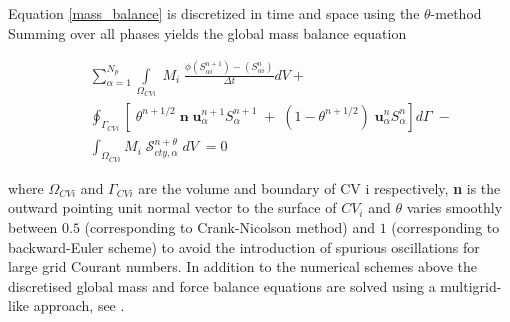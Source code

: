\documentclass[preprint,authoryear,12pt]{elsarticle}
\begin{document}
Equation \ref{mass_balance} is discretized in time and space using the $\theta$-method %
Summing over all phases yields the global mass balance equation %

\begin{eqnarray}
 && \sum_{\alpha=1}^{N_{p}} \int\limits_{\Omega_{CVi}} \; M_{i} \; \frac{\phi\left(S_{\alpha i}^{n+1}\right)-\left(S_{\alpha i}^{n}\right)}{\Delta t} dV  + \nonumber\\
 &&  \oint_{\Gamma_{CVi}} [\; \theta^{n+1/2}\; {\mathbf n}\dot \; {\mathbf u}_{\alpha}^{n+1}S_{\alpha}^{n+1} \; + \; (1-\theta^{n+1/2}) \; {\mathbf u}_{\alpha}^{n}S_{\alpha}^{n}] d\Gamma \;- \nonumber\\
 &&  \int_{\Omega_{CVi}} M_{i} \; \mathcal{S}_{cty,\alpha}^{n+\theta} \; dV\; =0
\label{global_mass_balance}
\end{eqnarray}

\noindent where $\Omega_{CVi}$ and $\Gamma_{CVi}$ are the volume and boundary of CV i respectively, \textbf{n} is the outward pointing unit normal vector to the surface of $CV_{i}$ and $\theta$ varies smoothly between $0.5$ (corresponding to Crank-Nicolson method) and $1$ (corresponding to backward-Euler scheme) to avoid the introduction of spurious oscillations for large grid Courant numbers. In addition to the numerical schemes above the discretised global mass and force balance equations are solved using a multigrid-like approach, see \citet{pavlidis2016}.


\end{document}
